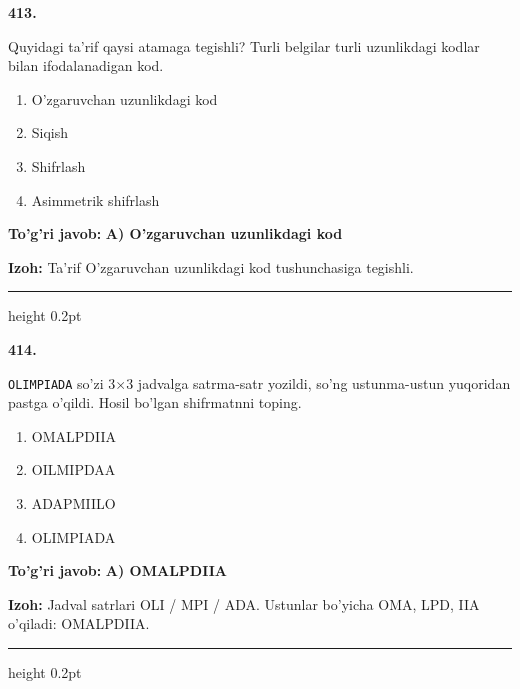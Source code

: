 \documentclass[10pt,a4paper,oneside]{article}
\begin{document}
\noindent\textbf{\color{ink}413.}
\par
Quyidagi ta'rif qaysi atamaga tegishli? Turli belgilar turli uzunlikdagi kodlar bilan ifodalanadigan kod.
\begin{enumerate}[label=\Alph*),leftmargin=9mm]
\item O'zgaruvchan uzunlikdagi kod
\item Siqish
\item Shifrlash
\item Asimmetrik shifrlash
\end{enumerate}
\begin{tcolorbox}[enhanced,breakable,colback=teal!4,colframe=teal!50!black,boxrule=0.5pt,arc=1.1mm,left=3mm,right=3mm,top=1.7mm,bottom=1.7mm,before skip=2mm,after skip=2mm]
\textbf{\color{teal}To'g'ri javob:} \textbf{A) O'zgaruvchan uzunlikdagi kod}
\par\smallskip
\textbf{Izoh:} Ta'rif O'zgaruvchan uzunlikdagi kod tushunchasiga tegishli.
\end{tcolorbox}
\vspace{2mm}\hrule height 0.2pt \vspace{3mm}

\noindent\textbf{\color{ink}414.}
\par
\texttt{OLIMPIADA} so'zi 3\ensuremath{\times}3 jadvalga satrma-satr yozildi, so'ng ustunma-ustun yuqoridan pastga o'qildi. Hosil bo'lgan shifrmatnni toping.
\begin{enumerate}[label=\Alph*),leftmargin=9mm]
\item OMALPDIIA
\item OILMIPDAA
\item ADAPMIILO
\item OLIMPIADA
\end{enumerate}
\begin{tcolorbox}[enhanced,breakable,colback=teal!4,colframe=teal!50!black,boxrule=0.5pt,arc=1.1mm,left=3mm,right=3mm,top=1.7mm,bottom=1.7mm,before skip=2mm,after skip=2mm]
\textbf{\color{teal}To'g'ri javob:} \textbf{A) OMALPDIIA}
\par\smallskip
\textbf{Izoh:} Jadval satrlari OLI / MPI / ADA. Ustunlar bo'yicha OMA, LPD, IIA o'qiladi: OMALPDIIA.
\end{tcolorbox}
\vspace{2mm}\hrule height 0.2pt \vspace{3mm}
\end{document}
